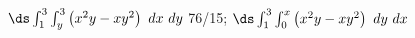 {$\ds \int_{1}^{3}\int_{y}^{3}\left(x^2y-xy^2\right)\ dx\ dy$\label{13_02_ex_08}
}
{76/15; $\ds \int_{1}^{3}\int_{0}^{x}\left(x^2y-xy^2\right)\ dy\ dx$
}